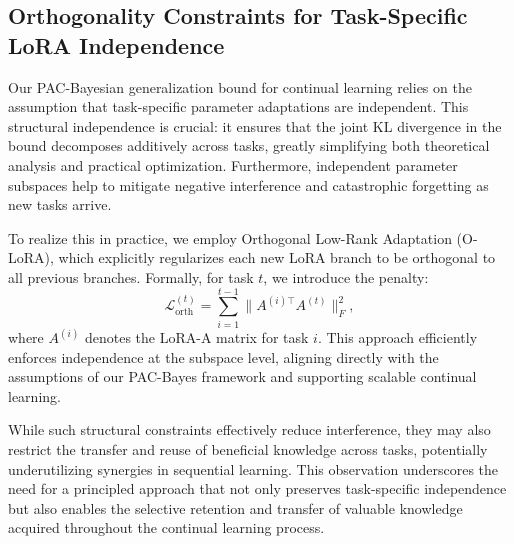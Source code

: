 \documentclass[letterpaper]{article} %
\begin{document}
\subsection{Orthogonality Constraints for Task-Specific LoRA Independence}

Our PAC-Bayesian generalization bound for continual learning relies on the assumption that task-specific parameter adaptations are independent. This structural independence is crucial: it ensures that the joint KL divergence in the bound decomposes additively across tasks, greatly simplifying both theoretical analysis and practical optimization. Furthermore, independent parameter subspaces help to mitigate negative interference and catastrophic forgetting as new tasks arrive.

To realize this in practice, we employ Orthogonal Low-Rank Adaptation (O-LoRA), which explicitly regularizes each new LoRA branch to be orthogonal to all previous branches. Formally, for task $t$, we introduce the penalty:
\begin{equation}
    \mathcal{L}_{\text{orth}}^{(t)} = \sum_{i=1}^{t-1} \|A^{(i)\top} A^{(t)}\|_F^2,
\end{equation}
where $A^{(i)}$ denotes the LoRA-A matrix for task $i$. This approach efficiently enforces independence at the subspace level, aligning directly with the assumptions of our PAC-Bayes framework and supporting scalable continual learning.


While such structural constraints effectively reduce interference, they may also restrict the transfer and reuse of beneficial knowledge across tasks, potentially underutilizing synergies in sequential learning. This observation underscores the need for a principled approach that not only preserves task-specific independence but also enables the selective retention and transfer of valuable knowledge acquired throughout the continual learning process.




\end{document}
